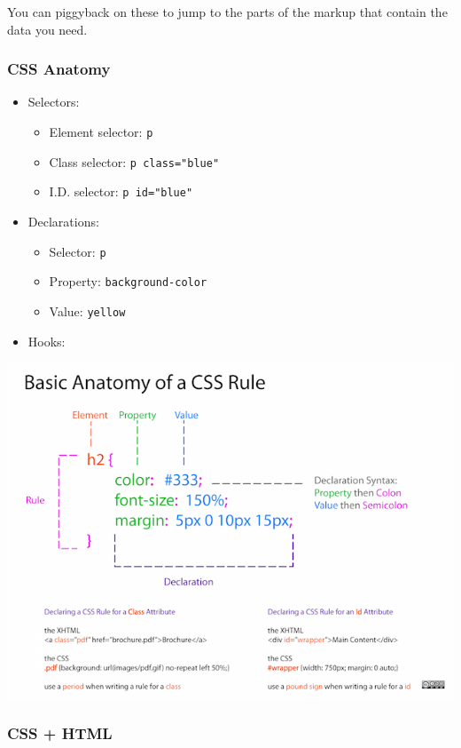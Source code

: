 \documentclass[
]{book}
\providecommand{\tightlist}{%
  \setlength{\itemsep}{0pt}\setlength{\parskip}{0pt}}
\begin{document}
You can piggyback on these to jump to the parts of the markup that contain the data you need.

\hypertarget{css-anatomy}{%
\subsubsection{CSS Anatomy}\label{css-anatomy}}

\begin{itemize}
\tightlist
\item
  Selectors:

  \begin{itemize}
  \tightlist
  \item
    Element selector: \texttt{p}
  \item
    Class selector: \texttt{p\ class="blue"}
  \item
    I.D. selector: \texttt{p\ id="blue"}
  \end{itemize}
\item
  Declarations:

  \begin{itemize}
  \tightlist
  \item
    Selector: \texttt{p}
  \item
    Property: \texttt{background-color}
  \item
    Value: \texttt{yellow}
  \end{itemize}
\item
  Hooks:
\end{itemize}

\begin{center}\includegraphics[width=0.7\linewidth]{img/css-rule-2} \end{center}

\hypertarget{css-html}{%
\subsubsection{CSS + HTML}\label{css-html}}
\end{document}
